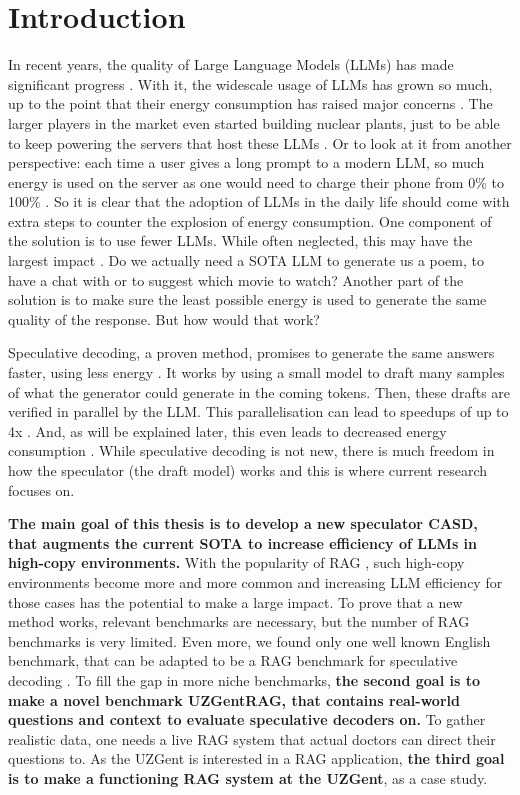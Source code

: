 \chapter{Introduction}
In recent years, the quality of Large Language Models (LLMs) has made significant progress \cite{zhao2023survey}. With it, the widescale usage of LLMs has grown so much, up to the point that their energy consumption has raised major concerns \cite{alizadeh2024analyzing, bender2021dangers, strubell2020energy}. The larger players in the market even started building nuclear plants, just to be able to keep powering the servers that host these LLMs \cite{luscombe2024three, wnn2025facebook, bbc2025ai}. Or to look at it from another perspective: each time a user gives a long prompt to a modern LLM, so much energy is used on the server as one would need to charge their phone from 0\% to 100\% \cite{epoch2025energy}. So it is clear that the adoption of LLMs in the daily life should come with extra steps to counter the explosion of energy consumption. One component of the solution is to use fewer LLMs. While often neglected, this may have the largest impact \cite{alcott2005jevons}. Do we actually need a SOTA LLM to generate us a poem, to have a chat with or to suggest which movie to watch? Another part of the solution is to make sure the least possible energy is used to generate the same quality of the response. But how would that work?

Speculative decoding, a proven method, promises to generate the same answers faster, using less energy \cite{leviathan2023fast, qin2024optimized}. It works by using a small model to draft many samples of what the generator could generate in the coming tokens. Then, these drafts are verified in parallel by the LLM. This parallelisation can lead to speedups of up to 4x \cite{li2024eagle}. And, as will be explained later, this even leads to decreased energy consumption \cite{qin2024optimized}. While speculative decoding is not new, there is much freedom in how the speculator (the draft model) works and this is where current research focuses on.

\textbf{The main goal of this thesis is to develop a new speculator CASD, that augments the current SOTA to increase efficiency of LLMs in high-copy environments.} With the popularity of RAG \cite{k2view2025GenAI, menlov2025state}, such high-copy environments become more and more common and increasing LLM efficiency for those cases has the potential to make a large impact. To prove that a new method works, relevant benchmarks are necessary, but the number of RAG benchmarks is very limited. Even more, we found only one well known English benchmark, that can be adapted to be a RAG benchmark for speculative decoding \cite{rajpurkar2016squad}. To fill the gap in more niche benchmarks, \textbf{the second goal is to make a novel benchmark UZGentRAG, that contains real-world questions and context to evaluate speculative decoders on.} To gather realistic data, one needs a live RAG system that actual doctors can direct their questions to. As the UZGent is interested in a RAG application, \textbf{the third goal is to make a functioning RAG system at the UZGent}, as a case study. 

